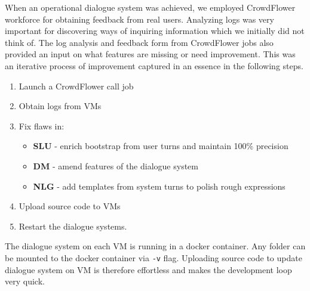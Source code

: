 When an operational dialogue system was achieved, we employed CrowdFlower workforce for obtaining feedback from real users.
Analyzing logs was very important for discovering ways of inquiring information which we initially did not think of.
The log analysis and feedback form from CrowdFlower jobs also provided an input on what features are missing or need improvement.
This was an iterative process of improvement captured in an essence in the following steps. %




\begin{enumerate}
	\item Launch a CrowdFlower call job
	\item Obtain logs from VMs
	\item Fix flaws in:
	\begin{itemize}
		\item \textbf{SLU} - enrich bootstrap from user turns and maintain 100\% precision
		\item \textbf{DM} - amend features of the dialogue system
		\item \textbf{NLG} - add templates from system turns to polish rough expressions
	\end{itemize}
	\item Upload source code to VMs
	\item Restart the dialogue systems.
\end{enumerate}


The dialogue system on each VM is running in a docker container.
Any folder can be mounted to the docker container via \texttt{-v} flag.
Uploading source code to update dialogue system on VM is therefore effortless and makes the development loop very quick.



